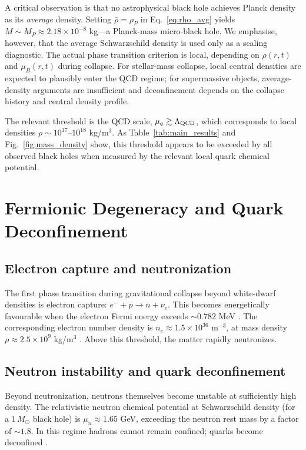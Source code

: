 \documentclass[epj]{svjour}
\begin{document}
A critical observation is that no astrophysical black hole achieves Planck density as its \emph{average} density. Setting $\bar\rho = \rho_P$ in Eq.~\eqref{eq:rho_avg} yields $M \sim M_P \approx 2.18 \times 10^{-8}$ kg---a Planck-mass micro-black hole. We emphasise, however, that the average Schwarzschild density is used only as a scaling diagnostic. The actual phase transition criterion is local, depending on $\rho(r,t)$ and $\mu_B(r,t)$ during collapse. For stellar-mass collapse, local central densities are expected to plausibly enter the QCD regime; for supermassive objects, average-density arguments are insufficient and deconfinement depends on the collapse history and central density profile.

The relevant threshold is the QCD scale, $\mu_q \gtrsim \Lambda_{\rm QCD}$, which corresponds to local densities $\rho \sim 10^{17}$--$10^{18}$ kg/m$^3$. As Table~\ref{tab:main_results} and Fig.~\ref{fig:mass_density} show, this threshold appears to be exceeded by all observed black holes when measured by the relevant local quark chemical potential.

\section{Fermionic Degeneracy and Quark Deconfinement}
\label{sec:degeneracy}

\subsection{Electron capture and neutronization}
\label{sec:ecap}

The first phase transition during gravitational collapse beyond white-dwarf densities is electron capture: $e^- + p \to n + \nu_e$. This becomes energetically favourable when the electron Fermi energy exceeds $\sim 0.782$ MeV \cite{ShapiroTeukolsky1983}. The corresponding electron number density is $n_e \approx 1.5 \times 10^{36}$ m$^{-3}$, at mass density $\rho \approx 2.5 \times 10^9$ kg/m$^3$ \cite{LandauLifshitz1980}. Above this threshold, the matter rapidly neutronizes.

\subsection{Neutron instability and quark deconfinement}
\label{sec:deconf}

Beyond neutronization, neutrons themselves become unstable at sufficiently high density. The relativistic neutron chemical potential at Schwarzschild density (for a $1\,M_\odot$ black hole) is $\mu_n \approx 1.65$ GeV, exceeding the neutron rest mass by a factor of $\sim 1.8$. In this regime hadrons cannot remain confined; quarks become deconfined \cite{HaenselPotekhinYakovlev2007}.
\end{document}
